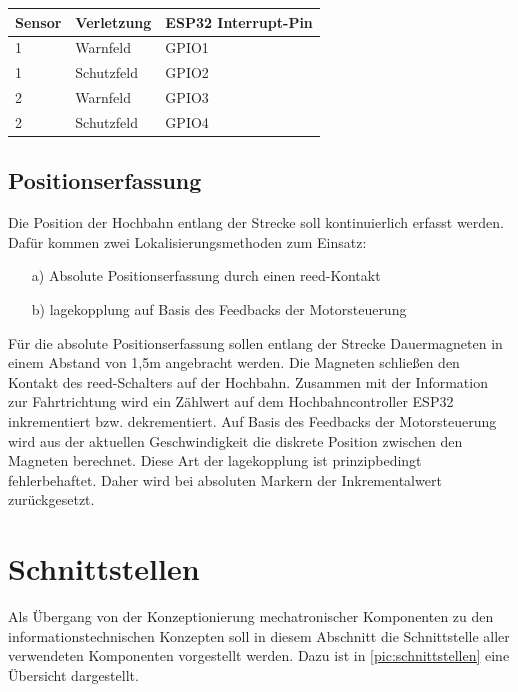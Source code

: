 \begin{center}
	\begin{tabular}[h]{l|l|l}
		Sensor & Verletzung  & ESP32 Interrupt-Pin \\
		\hline
		1 & Warnfeld & GPIO1\\
		\hline
		1 & Schutzfeld & GPIO2\\
		\hline
		2 & Warnfeld & GPIO3\\
		\hline
		2 & Schutzfeld & GPIO4\\	
	\end{tabular}
\end{center}
\newpage

\subsection{Positionserfassung}
\label{konzeptPositionserfassung}
Die Position der Hochbahn entlang der Strecke soll kontinuierlich erfasst werden. Dafür kommen zwei Lokalisierungsmethoden zum Einsatz: 

 \begin{itemize}
 	\item [a)] Absolute Positionserfassung durch einen \acrshort{reed}-Kontakt
 	\item[b)] \acrshort{lagekopplung} auf Basis des Feedbacks der Motorsteuerung  
 \end{itemize}

Für die absolute Positionserfassung sollen entlang der Strecke Dauermagneten in einem Abstand von 1,5m angebracht werden. Die Magneten schließen den Kontakt des  \acrshort{reed}-Schalters auf der Hochbahn. Zusammen mit der Information zur Fahrtrichtung wird ein Zählwert auf dem Hochbahncontroller ESP32 inkrementiert bzw. dekrementiert. Auf Basis des Feedbacks der Motorsteuerung wird aus der aktuellen Geschwindigkeit die diskrete Position zwischen den Magneten berechnet. Diese Art der \acrshort{lagekopplung} ist prinzipbedingt fehlerbehaftet. Daher wird bei absoluten Markern der Inkrementalwert zurückgesetzt. 
\newpage

\section{Schnittstellen}
\label{sec:konzeptSchnittstellen}
Als Übergang von der Konzeptionierung mechatronischer Komponenten zu den informationstechnischen Konzepten soll in diesem Abschnitt die Schnittstelle aller verwendeten Komponenten vorgestellt werden. Dazu ist in \autoref{pic:schnittstellen} eine Übersicht dargestellt.

